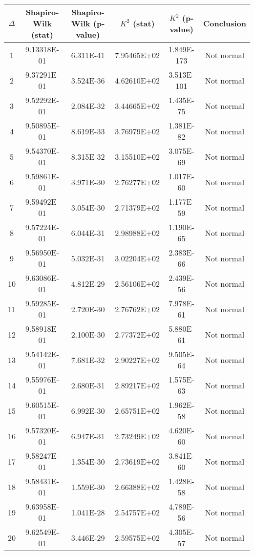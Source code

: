 \begin{table}[h]
	\begin{tabular}{|c|c|c|c|c|c|}
		\hline
		$\Delta$ &  Shapiro-Wilk (stat) & Shapiro-Wilk (p-value) & $K^2$ (stat) & $K^2$ (p-value) & Conclusion\\\hline
		\hline
		1 & 9.13318E-01 & 6.311E-41 & 7.95465E+02 & 1.849E-173 & Not normal\\\hline
		2 & 9.37291E-01 & 3.524E-36 & 4.62610E+02 & 3.513E-101 & Not normal\\\hline
		3 & 9.52292E-01 & 2.084E-32 & 3.44665E+02 & 1.435E-75 & Not normal\\\hline
		4 & 9.50895E-01 & 8.619E-33 & 3.76979E+02 & 1.381E-82 & Not normal\\\hline
		5 & 9.54370E-01 & 8.315E-32 & 3.15510E+02 & 3.075E-69 & Not normal\\\hline
		6 & 9.59861E-01 & 3.971E-30 & 2.76277E+02 & 1.017E-60 & Not normal\\\hline
		7 & 9.59492E-01 & 3.054E-30 & 2.71379E+02 & 1.177E-59 & Not normal\\\hline
		8 & 9.57224E-01 & 6.044E-31 & 2.98988E+02 & 1.190E-65 & Not normal\\\hline
		9 & 9.56950E-01 & 5.032E-31 & 3.02204E+02 & 2.383E-66 & Not normal\\\hline
		10 & 9.63086E-01 & 4.812E-29 & 2.56106E+02 & 2.439E-56 & Not normal\\\hline
		11 & 9.59285E-01 & 2.720E-30 & 2.76762E+02 & 7.978E-61 & Not normal\\\hline
		12 & 9.58918E-01 & 2.100E-30 & 2.77372E+02 & 5.880E-61 & Not normal\\\hline
		13 & 9.54142E-01 & 7.681E-32 & 2.90227E+02 & 9.505E-64 & Not normal\\\hline
		14 & 9.55976E-01 & 2.680E-31 & 2.89217E+02 & 1.575E-63 & Not normal\\\hline
		15 & 9.60515E-01 & 6.992E-30 & 2.65751E+02 & 1.962E-58 & Not normal\\\hline
		16 & 9.57320E-01 & 6.947E-31 & 2.73249E+02 & 4.620E-60 & Not normal\\\hline
		17 & 9.58247E-01 & 1.354E-30 & 2.73619E+02 & 3.841E-60 & Not normal\\\hline
		18 & 9.58431E-01 & 1.559E-30 & 2.66388E+02 & 1.428E-58 & Not normal\\\hline
		19 & 9.63958E-01 & 1.041E-28 & 2.54757E+02 & 4.789E-56 & Not normal\\\hline
		20 & 9.62549E-01 & 3.446E-29 & 2.59575E+02 & 4.305E-57 & Not normal\\\hline

\end{tabular}
\end{table}
